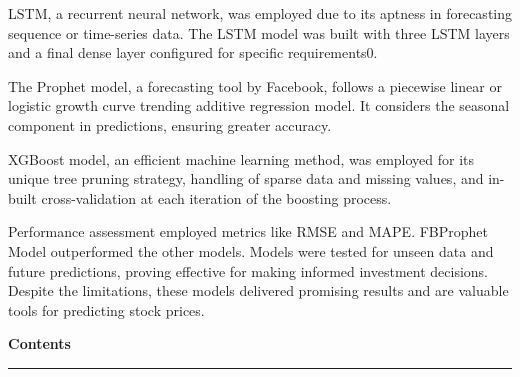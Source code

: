 \documentclass[12pt]{article}
\begin{document}
LSTM, a recurrent neural network, was employed due to its aptness in forecasting sequence or time-series data. The LSTM model was built with three LSTM layers and a final dense layer configured for specific requirements0.

The Prophet model, a forecasting tool by Facebook, follows a piecewise linear or logistic growth curve trending additive regression model. It considers the seasonal component in predictions, ensuring greater accuracy.

XGBoost model, an efficient machine learning method, was employed for its unique tree pruning strategy, handling of sparse data and missing values, and in-built cross-validation at each iteration of the boosting process. 

Performance assessment employed metrics like RMSE and MAPE. FBProphet Model outperformed the other models. Models were tested for unseen data and future predictions, proving effective for making informed investment decisions. Despite the limitations, these models delivered promising results and are valuable tools for predicting stock prices.

\thispagestyle{empty}
\pagebreak
\Huge{\textbf{Contents}}
\vspace{.1in}
    \hrule height 0.25mm
\vspace{0.15in}
\tableofcontents
\thispagestyle{empty}
\pagebreak
\clearpage
{}
\end{document}
